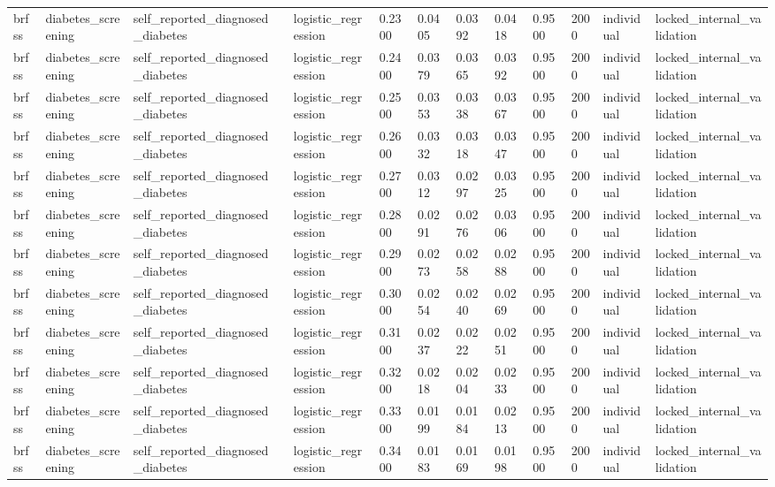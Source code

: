 \begin{tabular}{lllllllllllll}
brfss & diabetes\_screening & self\_reported\_diagnosed\_diabetes &  & logistic\_regression & 0.2300 & 0.0405 & 0.0392 & 0.0418 & 0.9500 & 2000 & individual & locked\_internal\_validation \\
brfss & diabetes\_screening & self\_reported\_diagnosed\_diabetes &  & logistic\_regression & 0.2400 & 0.0379 & 0.0365 & 0.0392 & 0.9500 & 2000 & individual & locked\_internal\_validation \\
brfss & diabetes\_screening & self\_reported\_diagnosed\_diabetes &  & logistic\_regression & 0.2500 & 0.0353 & 0.0338 & 0.0367 & 0.9500 & 2000 & individual & locked\_internal\_validation \\
brfss & diabetes\_screening & self\_reported\_diagnosed\_diabetes &  & logistic\_regression & 0.2600 & 0.0332 & 0.0318 & 0.0347 & 0.9500 & 2000 & individual & locked\_internal\_validation \\
brfss & diabetes\_screening & self\_reported\_diagnosed\_diabetes &  & logistic\_regression & 0.2700 & 0.0312 & 0.0297 & 0.0325 & 0.9500 & 2000 & individual & locked\_internal\_validation \\
brfss & diabetes\_screening & self\_reported\_diagnosed\_diabetes &  & logistic\_regression & 0.2800 & 0.0291 & 0.0276 & 0.0306 & 0.9500 & 2000 & individual & locked\_internal\_validation \\
brfss & diabetes\_screening & self\_reported\_diagnosed\_diabetes &  & logistic\_regression & 0.2900 & 0.0273 & 0.0258 & 0.0288 & 0.9500 & 2000 & individual & locked\_internal\_validation \\
brfss & diabetes\_screening & self\_reported\_diagnosed\_diabetes &  & logistic\_regression & 0.3000 & 0.0254 & 0.0240 & 0.0269 & 0.9500 & 2000 & individual & locked\_internal\_validation \\
brfss & diabetes\_screening & self\_reported\_diagnosed\_diabetes &  & logistic\_regression & 0.3100 & 0.0237 & 0.0222 & 0.0251 & 0.9500 & 2000 & individual & locked\_internal\_validation \\
brfss & diabetes\_screening & self\_reported\_diagnosed\_diabetes &  & logistic\_regression & 0.3200 & 0.0218 & 0.0204 & 0.0233 & 0.9500 & 2000 & individual & locked\_internal\_validation \\
brfss & diabetes\_screening & self\_reported\_diagnosed\_diabetes &  & logistic\_regression & 0.3300 & 0.0199 & 0.0184 & 0.0213 & 0.9500 & 2000 & individual & locked\_internal\_validation \\
brfss & diabetes\_screening & self\_reported\_diagnosed\_diabetes &  & logistic\_regression & 0.3400 & 0.0183 & 0.0169 & 0.0198 & 0.9500 & 2000 & individual & locked\_internal\_validation \\

\end{tabular}
